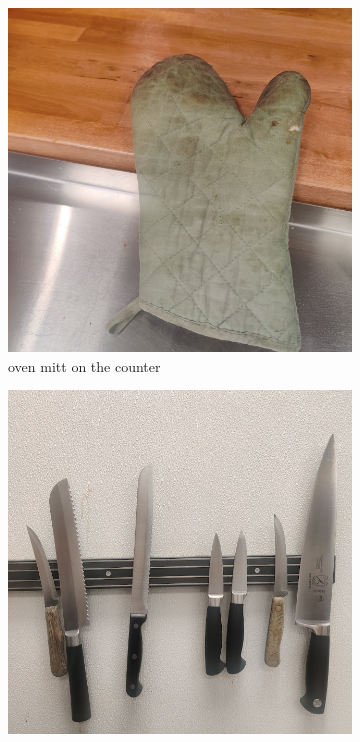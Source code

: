 \documentclass[]{article}
\begin{document}
\begin{figure}[h]
    \centering
    \begin{subfigure}[b]{0.2\textwidth}
        \centering
        \includegraphics[width=\textwidth]{dataset/0.jpg}
        \caption{oven mitt on the counter}
    \end{subfigure}
    \begin{subfigure}[b]{0.2\textwidth}
        \centering
        \includegraphics[width=\textwidth]{dataset/1.jpg}

\end{subfigure}
\end{figure}
\end{document}
